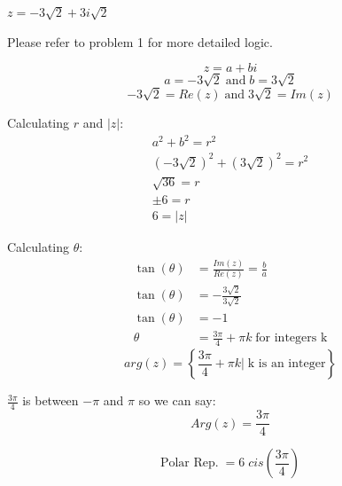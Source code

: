 \begin{problem}[4.]
    $ z = -3\sqrt{2} + 3 i \sqrt{2}$
\end{problem}

\begin{solution}
    Please refer to problem 1 for more detailed logic. 
    
    \[z = a + bi\]
    \[a = -3\sqrt{2} \; \text{and} \; b = 3\sqrt{2} \]
    \[ \boxed{ -3\sqrt{2} = Re(z)} \; \text{and} \; \boxed{ 3\sqrt{2} = Im(z) }\]
    
    Calculating $r$ and $|z|$:
    \begin{align}
        a^2 + b^2 = r^2 \\
        (-3\sqrt{2})^2 + (3\sqrt{2})^2 = r^2 \\
        \sqrt{36} = r \\
        \boxed{\pm 6 = r} \\ 
        \boxed{6 = |z|}
    \end{align}
    
    Calculating $\theta$:
    \begin{align}
        \tan(\theta) &= \frac{Im(z)}{Re(z)} = \frac{b}{a} \\
        \tan(\theta) &= -\frac{ 3\sqrt{2} }{ 3\sqrt{2} } \\ 
        \tan(\theta) &= -1 \\
        \theta &= \frac{3\pi}{4} + \pi k \; \text{for integers k}
    \end{align}
    \[ \boxed{arg(z) = \left\{ \frac{3\pi}{4} + \pi k | \; \text{k is an integer} \right\} } \]
    
    $\frac{3\pi}{4}$ is between $-\pi$ and $\pi$ so we can say:
    \[ \boxed{Arg(z) = \frac{3\pi}{4} }\]
    
    \[\boxed{ \text{Polar Rep.} \; = 6 \; cis \left( \frac{3\pi}{4} \right) }\]
\end{solution}